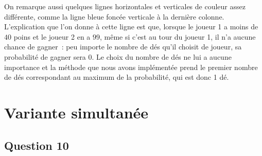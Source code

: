 \documentclass[a4paper,11pt]{amsart}
\theoremstyle{plain}
\begin{document}
On remarque aussi quelques lignes horizontales et verticales de couleur assez différente, comme la ligne bleue foncée verticale à la dernière colonne. L'explication que l'on donne à cette ligne est que, lorsque le joueur 1 a moins de $40$ poins et le joueur 2 en a $99$, même si c'est au tour du joueur 1, il n'a aucune chance de gagner~: peu importe le nombre de dés qu'il choisit de joueur, sa probabilité de gagner sera 0. Le choix du nombre de dés ne lui a aucune importance et la méthode que nous avons implémentée prend le premier nombre de dés correspondant au maximum de la probabilité, qui est donc 1 dé.

\section{Variante simultanée}

\subsection{Question 10}
\end{document}
